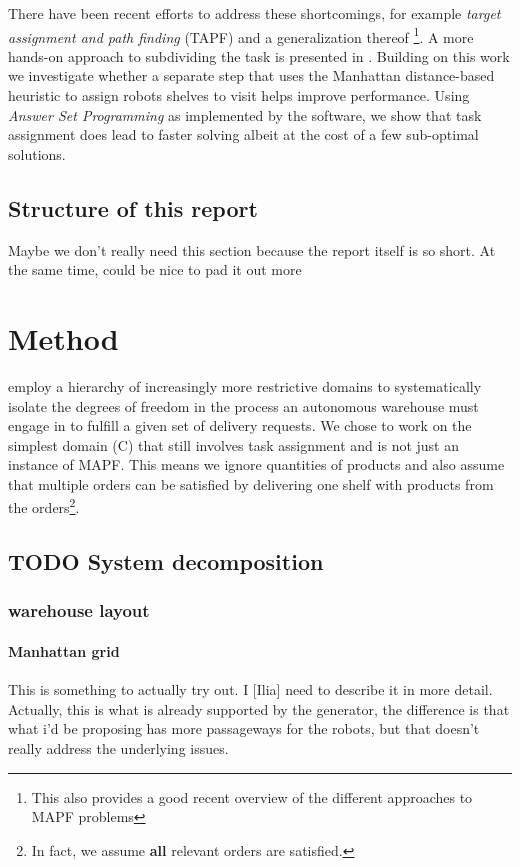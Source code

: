  There have been recent efforts to address these shortcomings, for example \emph{target assignment and path finding} (TAPF)  \cite{ma2016optimal} and a generalization thereof \cite{DBLP:conf-ijcai-NguyenOSS017} \footnote{This also provides a good recent overview of the different approaches to MAPF problems}.
A more hands-on approach to subdividing the task is presented in \cite{gebser2018experimenting}.
Building on this work we investigate whether a separate step that uses the Manhattan distance-based heuristic to assign robots shelves to visit helps improve performance.
Using \emph{Answer Set Programming} \cite{lifschitz2002answer} as implemented by the \cite{gebser2014clingo} software, we show that task assignment does lead to faster solving albeit at the cost of a few sub-optimal solutions.

\subsection{Structure of this report}
\label{sec:orgb773f4a}
Maybe we don't really need this section because the report itself is so short.
At the same time, could be nice to pad it out more

\section{Method}
\label{sec:org25a72e5}
\cite{gebser2018experimenting} employ a hierarchy of increasingly more restrictive domains to systematically isolate the degrees of freedom in the process an autonomous warehouse must engage in to fulfill a given set of delivery requests.
 We chose to work on the simplest domain (C) that still involves task assignment and is not just an instance of MAPF.
 This means we ignore quantities of products and also assume that multiple orders can be satisfied by delivering one shelf with products from the orders\footnote{In fact, we assume \textbf{all} relevant orders are satisfied.}.

\subsection{{\bfseries\sffamily TODO} System decomposition}
\label{sec:orgd35f5df}
\subsubsection{warehouse layout}
\label{sec:org814d6f1}
\paragraph{Manhattan grid}
\label{sec:org1b3c193}
This is something to actually try out. I [Ilia] need to describe it in more detail.
Actually, this is what is already supported by the generator, the difference is that what i'd be proposing has more passageways for the robots, but that doesn't really address the underlying issues.

